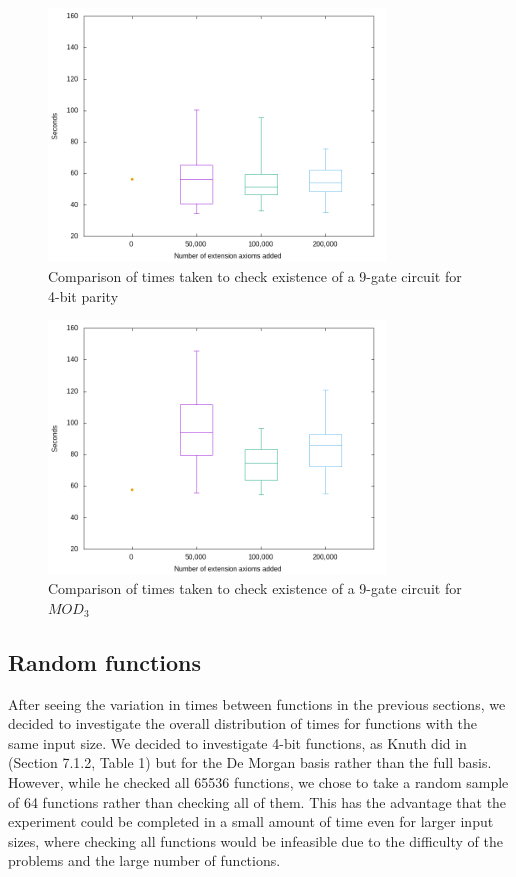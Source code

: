 \documentclass{article}
\begin{document}
\begin{figure}[h!]
  \centering
  \includegraphics[width=0.8\textwidth]{images/extvars/boxplot_4parity_medians.png}
  \caption{Comparison of times taken to check existence of a 9-gate circuit for 4-bit parity  \label{fig:extparity}}
\end{figure}

\clearpage 

  \begin{figure}[h!]
  \centering
  \includegraphics[width=0.8\textwidth]{images/extvars/boxplot_4mod3_medians.png}
  \caption{Comparison of times taken to check existence of a 9-gate circuit for \(MOD_3\)  \label{fig:extmod3}}
\end{figure}


\subsection{Random functions}\label{randomresults}

After seeing the variation in times between functions in the previous sections, we decided to investigate the overall distribution of times for functions with the same input size. We decided to investigate 4-bit functions, as Knuth did in ~\cite{knuth15} (Section 7.1.2, Table 1) but for the De Morgan basis rather than the full basis. However, while he checked all 65536 functions, we chose to take a random sample of 64 functions rather than checking all of them. This has the advantage that the experiment could be completed in a small amount of time even for larger input sizes, where checking all functions would be infeasible due to the difficulty of the problems and the large number of functions. 
\end{document}
